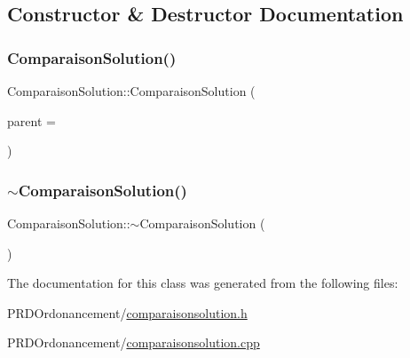 \subsection{Constructor \& Destructor Documentation}
\mbox{\label{classComparaisonSolution_a7fc9723f5a627d53e331719c3f47c7cc}} 
\subsubsection{\texorpdfstring{Comparaison\+Solution()}{ComparaisonSolution()}}
{\footnotesize\ttfamily Comparaison\+Solution\+::\+Comparaison\+Solution (\begin{DoxyParamCaption}\item[{Q\+Widget $\ast$}]{parent = {} }\end{DoxyParamCaption})\hspace{0.3cm}{\ttfamily [explicit]}}

\mbox{\label{classComparaisonSolution_a07a910b473173981273789934cf34e7f}} 
\subsubsection{\texorpdfstring{$\sim$\+Comparaison\+Solution()}{~ComparaisonSolution()}}
{\footnotesize\ttfamily Comparaison\+Solution\+::$\sim$\+Comparaison\+Solution (\begin{DoxyParamCaption}{ }\end{DoxyParamCaption})}



The documentation for this class was generated from the following files\+:\begin{DoxyCompactItemize}
\item 
P\+R\+D\+Ordonancement/\hyperlink{comparaisonsolution_8h}{comparaisonsolution.\+h}\item 
P\+R\+D\+Ordonancement/\hyperlink{comparaisonsolution_8cpp}{comparaisonsolution.\+cpp}\end{DoxyCompactItemize}
